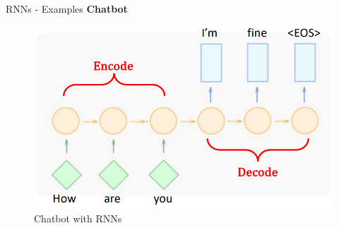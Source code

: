 \begin{frame}[allowframebreaks]{RNNs - Examples}
\framebreak
\textbf{Chatbot}
\begin{figure}
    \centering
    \includegraphics[height=0.7\textheight, width=\textwidth, keepaspectratio]{images/autoregressive/chatbot.png}
    \caption*{Chatbot with RNNs}
\end{figure}
\end{frame}